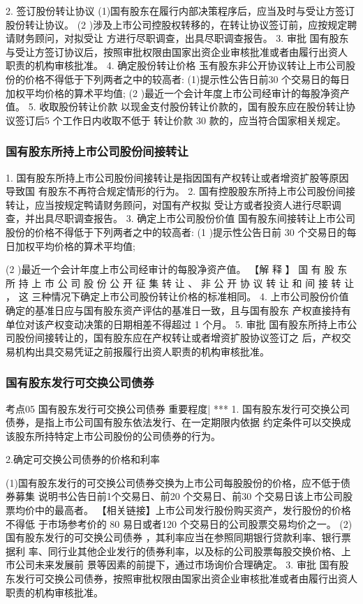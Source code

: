 \documentclass[UTF8,12pt]{ctexart}
\numberwithin{equation}{section} %
\numberwithin{figure}{section}
\numberwithin{table}{section}
\begin{document}
	2. 签订股份转让协议
	(1)国有股东在履行内部决策程序后，应当及时与受让方签订股份转让协议。
	(2 )涉及上市公司控股权转移的，在转让协议签订前，应按规定聘请财务顾问，对拟受让
	方进行尽职调查，出具尽职调查报告。
	3. 审批
	国有股东与受让方签订协议后，按照审批权限由国家出资企业审核批准或者由履行出资人
	职责的机构审核批准。
	4. 确定股份转让价格
	玉有股东非公开协议转让上市公司股份的价格不得低于下列两者之中的较高者:
	(1)提示性公告日前30 个交易日的每日加权平均价格的算术平均值;
	(2 )最近一个会计年度上市公司经审计的每股净资产值。
	5. 收取股份转让价款
	以现金支付股份转让价款的，国有股东应在股份转让协议签订后5 个工作日内收取不低于
	转让价款 30%
	款的，应当符合国家相关规定。
	
	\subsubsection{国有股东所持上市公司股份间接转让}
	1. 国有股东所持上市公司股份间接转让是指因国有产权转让或者增资扩股等原因导致国
	有股东不再符合规定情形的行为。
	2. 国有控股股东所持上市公司股份间接转让，应当按规定鸭请财务顾问，对国有产权拟
	受让方或者投资人进行尽职调查，并出具尽职调查报告。
	3. 确定上市公司股份价值
	国有股东间接转让上市公司股份的价格不得低于下列两者之中的较高者:
	(1 )提示性公告日前 30 个交易日的每日加权平均价格的算术平均值;
	
	(2 )最近一个会计年度上市公司经审计的每股净资产值。
	【解 释 】 国 有 股 东 所 持 上 市 公 司 股 份 公 开 征 集 转 让 、 非 公 开 协 议 转 让 和 间 接 转 让 ， 这
	三种情况下确定上市公司股份转让价格的标准相同。
	4. 上市公司股份价值确定的基准日应与国有股东资产评估的基准日一致，且与国有股东
	产权直接持有单位对该产权变动决策的日期相差不得超过 1 个月。
	5. 审批
	国有股东所持上市公司股份间接转让的，国有股东应在产权转让或者增资扩股协议签订之
	后，产权交易机构出具交易凭证之前报履行出资人职责的机构审核批准。
	
	\subsubsection{国有股东发行可交换公司债券}
	考点05 国有股东发行可交换公司债券 重要程度| ***
	1. 国有股东发行可交换公司债券，是指上市公司国有股东依法发行、在一定期限内依据
	约定条件可以交换成该股东所持特定上市公司股份的公司债券的行为。
	
	2.确定可交换公司债券的价格和利率
	
	(1)国有股东发行的可交换公司债券交换为上市公司每股股份的价格，应不低于债券募集
	说明书公告日前1个交易日、前20 个交易日、前30 个交易日该上市公司股票均价中的最高者。
	【相关链接】上市公司发行股份购买资产，发行股份的价格不得低 于市场参考价的
	80%
	易日或者120 个交易日的公司股票交易均价之一。
	(2)国有股东发行的可交换公司债券 ，其利率应当在参照同期银行贷款利率、银行票据利
	率、同行业其他企业发行的债券利率，以及标的公司股票每股交换价格、上市公司未来发展前
	景等因素的前提下，通过市场询价合理确定。
	3. 审批
	国有股东发行可交换公司债券，按照审批权限由国家出资企业审核批准或者由履行出资人
	职责的机构审核批准。
	
\end{document}
